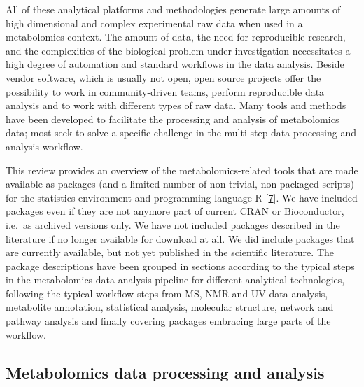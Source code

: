 \documentclass[]{article}
\begin{document}
All of these analytical platforms and methodologies generate large amounts of high dimensional and complex experimental raw data when used in a metabolomics context. The amount of data, the need for reproducible research, and the complexities of the biological problem under investigation necessitates a high degree of automation and standard workflows in the data analysis. Beside vendor software, which is usually not open, open source projects offer the possibility to work in community-driven teams, perform reproducible data analysis and to work with different types of raw data. Many tools and methods have been developed to facilitate the processing and analysis of metabolomics data; most seek to solve a specific challenge in the multi-step data processing and analysis workflow.

This review provides an overview of the metabolomics-related tools that are made available as packages (and a limited number of non-trivial, non-packaged scripts) for the statistics environment and programming language R {[}\protect\hyperlink{ref-rcoredevelopmentteam_website_2018}{7}{]}. We have included packages even if they are not anymore part of current CRAN or Bioconductor, i.e.~as archived versions only. We have not included packages described in the literature if no longer available for download at all. We did include packages that are currently available, but not yet published in the scientific literature. The package descriptions have been grouped in sections according to the typical steps in the metabolomics data analysis pipeline for different analytical technologies, following the typical workflow steps from MS, NMR and UV data analysis, metabolite annotation, statistical analysis, molecular structure, network and pathway analysis and finally covering packages embracing large parts of the workflow.

\newpage

\hypertarget{metabolomics-data-processing-and-analysis}{%
\subsection{Metabolomics data processing and analysis}\label{metabolomics-data-processing-and-analysis}}
\end{document}
